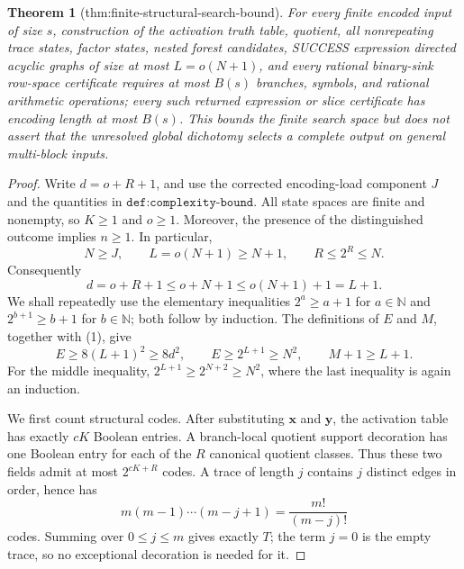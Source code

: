 \documentclass{article}
\newtheorem{theorem}{Theorem}
\begin{document}
\begin{theorem}[thm:finite-structural-search-bound]\label{thm:finite-structural-search-bound}
For every finite encoded input of size \(s\), construction of the activation truth table, quotient, all nonrepeating trace states, factor states, nested forest candidates, SUCCESS expression directed acyclic graphs of size at most \(L=o(N+1)\), and every rational binary-sink row-space certificate requires at most \(B(s)\) branches, symbols, and rational arithmetic operations; every such returned expression or slice certificate has encoding length at most \(B(s)\). This bounds the finite search space but does not assert that the unresolved global dichotomy selects a complete output on general multi-block inputs.
\end{theorem}
\begin{proof}
Write \(d=o+R+1\), and use the corrected encoding-load component \(J\) and the quantities in \(\texttt{def:complexity-bound}\).  All state spaces are finite and nonempty, so \(K\geq 1\) and \(o\geq 1\).  Moreover, the presence of the distinguished outcome implies \(n\geq 1\).  In particular,
\[
 N\geq J,
 \qquad
 L=o(N+1)\geq N+1,
 \qquad
 R\leq 2^R\leq N.
\]
Consequently
\[
 d=o+R+1\leq o+N+1\leq o(N+1)+1=L+1. \tag{1}
\]
We shall repeatedly use the elementary inequalities \(2^a\geq a+1\) for \(a\in\mathbb N\) and \(2^{b+1}\geq b+1\) for \(b\in\mathbb N\); both follow by induction.  The definitions of \(E\) and \(M\), together with (1), give
\[
 E\geq 8(L+1)^2\geq 8d^2,
 \qquad
 E\geq 2^{L+1}\geq N^2,
 \qquad
 M+1\geq L+1. \tag{2}
\]
For the middle inequality, \(2^{L+1}\geq 2^{N+2}\geq N^2\), where the last inequality is again an induction.

We first count structural codes.  After substituting \(\mathbf x\) and \(\mathbf y\), the activation table has exactly \(cK\) Boolean entries.  A branch-local quotient support decoration has one Boolean entry for each of the \(R\) canonical quotient classes.  Thus these two fields admit at most \(2^{cK+R}\) codes.  A trace of length \(j\) contains \(j\) distinct edges in order, hence has
\[
 m(m-1)\cdots(m-j+1)=\frac{m!}{(m-j)!}
\]
codes.  Summing over \(0\leq j\leq m\) gives exactly \(T\); the term \(j=0\) is the empty trace, so no exceptional decoration is needed for it.


\end{proof}
\end{document}
